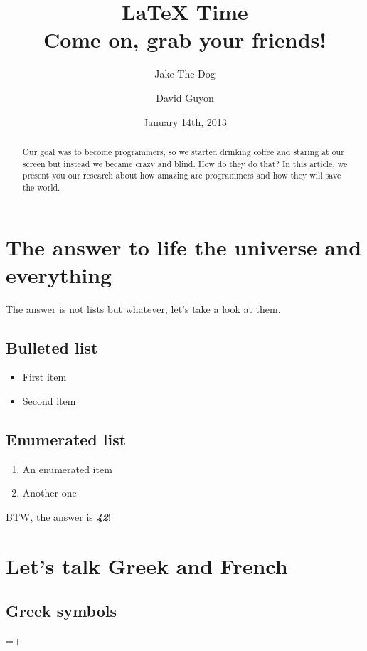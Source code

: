 \documentclass[11pt]{scrartcl}
\begin{document}
%
%
\author{Jake The Dog \and David Guyon}
\date{January 14th, 2013}
\title{LaTeX Time\\Come on, grab your friends!}
\maketitle

%
%
\begin{abstract}
Our goal was to become programmers, so we started drinking coffee and staring at our screen but instead we became crazy and blind. How do they do that? In this article, we present you our research about how amazing are programmers and how they will save the world.
\end{abstract}

%
%
\section{The answer to life the universe and everything}

The answer is not lists but whatever, let's take a look at them.

\subsection{Bulleted list}
\begin{itemize}
\item First item
\item Second item
\end{itemize}

\subsection{Enumerated list}
\begin{enumerate}
\item An enumerated item
\item Another one
\end{enumerate}

BTW, the answer is \textbf{\textit{42}}! 

%
%
\section{Let's talk Greek and French}

\subsection{Greek symbols}
\textsigma=\textrho\textOmega+\textPhi
\end{document}
